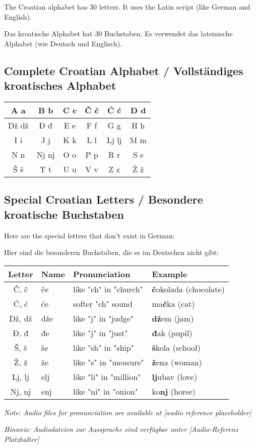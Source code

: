 \begin{vocabulary}
The Croatian alphabet has 30 letters. It uses the Latin script (like German and English).

Das kroatische Alphabet hat 30 Buchstaben. Es verwendet das lateinische Alphabet (wie Deutsch und Englisch).

\subsection*{Complete Croatian Alphabet / Vollständiges kroatisches Alphabet}

\begin{center}
\begin{tabular}{|c|c|c|c|c|c|}
\hline
A a & B b & C c & Č č & Ć ć & D d \\
\hline
Dž dž & Đ đ & E e & F f & G g & H h \\
\hline
I i & J j & K k & L l & Lj lj & M m \\
\hline
N n & Nj nj & O o & P p & R r & S s \\
\hline
Š š & T t & U u & V v & Z z & Ž ž \\
\hline
\end{tabular}
\end{center}

\subsection*{Special Croatian Letters / Besondere kroatische Buchstaben}

Here are the special letters that don't exist in German:

Hier sind die besonderen Buchstaben, die es im Deutschen nicht gibt:

\begin{center}
\begin{tabular}{clll}
\toprule
Letter & Name & Pronunciation & Example \\
\midrule
Č, č & če & like "ch" in "church" & \textbf{č}okolada (chocolate) \\
Ć, ć & će & softer "ch" sound & ma\textbf{ć}ka (cat) \\
Dž, dž & dže & like "j" in "judge" & \textbf{dž}em (jam) \\
Đ, đ & đe & like "j" in "just" & \textbf{đ}ak (pupil) \\
Š, š & še & like "sh" in "ship" & \textbf{š}kola (school) \\
Ž, ž & že & like "s" in "measure" & \textbf{ž}ena (woman) \\
Lj, lj & elj & like "li" in "million" & \textbf{lj}ubav (love) \\
Nj, nj & enj & like "ni" in "onion" & ko\textbf{nj} (horse) \\
\bottomrule
\end{tabular}
\end{center}

\textit{Note: Audio files for pronunciation are available at [audio reference placeholder]}

\textit{Hinweis: Audiodateien zur Aussprache sind verfügbar unter [Audio-Referenz Platzhalter]}
\end{vocabulary}

